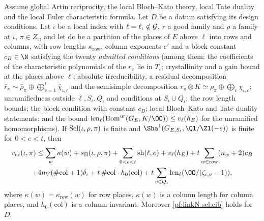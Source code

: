 \begin{theorem}\label{pf:linkN-sel:glit}
Assume global Artin reciprocity, the local Bloch--Kato theory, local Tate duality and the local Euler characteristic formula. Let $D$ be a
datum satisfying its design conditions. Let $\iota$ be a local index with $\ell=\ell_\iota\notin\mathcal G$, $r$ a good family and $\rho$ a
family at $\iota$, $\pi\in Z_\iota$, and let $\mathrm{dc}$ be a partition of the places of $E$ above $\ell$ into rows and columns, with row
lengths $\kappa_{\mathrm{row}}$, column exponents $e'$ and a block constant $c_B\in\N$ satisfying the twenty \emph{admitted conditions} (among
them: the coefficients of the characteristic polynomials of the $r_x$ lie in $T_\iota$; crystallinity and a gain bound at the places
above $\ell$; absolute irreducibility, a residual decomposition $\bar r_\pi\sim\bar\rho_\pi\oplus\bigoplus_{c=1}^t\bar\chi_{\iota,c}$ and
the semisimple decomposition $r_\pi\otimes K\simeq\rho_\pi\oplus\bigoplus_c\chi_{\iota,c}$; unramifiedness outside $\ell,S_\iota,Q_\iota$ and
conditions at $S_\iota\cup Q_\iota$; the row length bounds; the block condition with constant $c_B$; local Bloch--Kato and Tate duality
statements; and the bound $\linkNsellen(\mathrm{Hom}^{\mathrm{ur}}(G_E,K/\OO))\le v_\ell(h_E)$ for the unramified homomorphisms). If
$\operatorname{Sel}(\iota,\rho,\pi)$ is finite and $\Sha^1(G_{E,S_\ell},\Ql/\Zl(-e))$ is finite for $0<e<t$, then
\begin{multline}\label{eq:pf:linkN-sel:glit}
\linkNselvcc(\iota,\pi)\le\sum_{w}\kappa(w)+\linkNselsP(\iota,\rho,\pi)+\sum_{0<e<t}\mathrm{sh}(\ell,e)+v_\ell(h_E)
+t\sum_{w\in\mathrm{row}}(n_w+2)c_B\\
+4n_V(\#\mathrm{col}+1)\delta_\iota+t\,\#\mathrm{col}\cdot h_0(\mathrm{col})+t\sum_{v\in Q_\iota}\linkNsellen(\OO/(\zeta_{\iota,v}-1)),
\end{multline}
where $\kappa(w)=\kappa_{\mathrm{row}}(w)$ for row places, $\kappa(w)$ is a column length for column places, and $h_0(\mathrm{col})$
is a column invariant. Moreover \cref{pf:linkN-sel:eib} holds for $D$.
\end{theorem}

